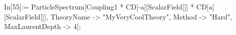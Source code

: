 In[55]:= ParticleSpectrum[Coupling1 * CD[-a][ScalarField[]] * CD[a][ScalarField[]], TheoryName -> "MyVeryCoolTheory", Method -> "Hard", MaxLaurentDepth -> 4]; 